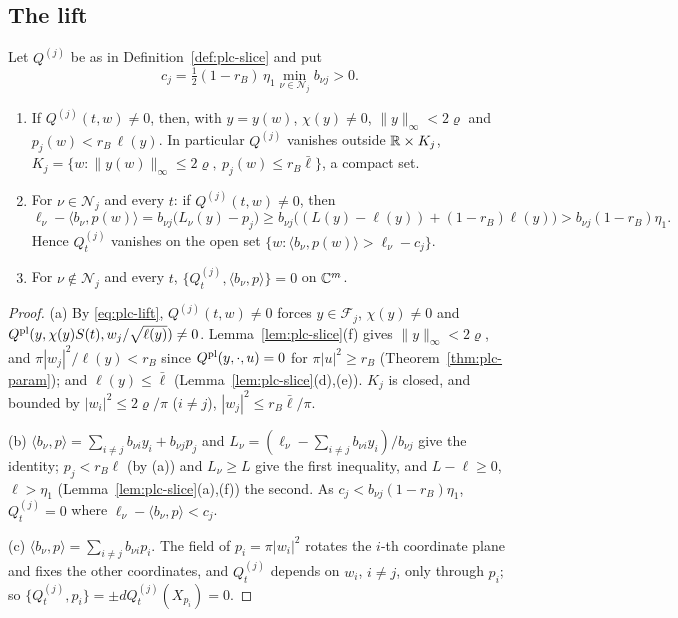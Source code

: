 \subsection{The lift}\label{sec:plc-lift}

\begin{lemma}\label{lem:plc-faces}
Let $Q^{(j)}$ be as in Definition~\ref{def:plc-slice} and put
\[
 c_j=\tfrac12(1-r_B)\,\eta_1\min_{\nu\in\mathcal N_j}b_{\nu j}>0.
\]
\begin{enumerate}[label=(\alph*)]
\item If $Q^{(j)}(t,w)\ne0$, then, with $y=y(w)$, $\chi(y)\ne0$, $\|y\|_\infty<2\varrho$ and $p_j(w)<r_B\,\ell(y)$. In particular
 $Q^{(j)}$ vanishes outside $\mathbb{R}\times K_j$, $K_j=\{w:\|y(w)\|_\infty\le2\varrho,\ p_j(w)\le r_B\bar\ell\}$, a compact set.
\item For $\nu\in\mathcal N_j$ and every $t$: if $Q^{(j)}(t,w)\ne0$, then
 \begin{equation}\label{eq:plc-collar}
  \ell_\nu-\langle b_\nu,p(w)\rangle=b_{\nu j}\bigl(L_\nu(y)-p_j\bigr)\ge b_{\nu j}\bigl((L(y)-\ell(y))+(1-r_B)\ell(y)\bigr)
  >b_{\nu j}(1-r_B)\eta_1 .
 \end{equation}
 Hence $Q^{(j)}_t$ vanishes on the open set $\{w:\langle b_\nu,p(w)\rangle>\ell_\nu-c_j\}$.
\item For $\nu\notin\mathcal N_j$ and every $t$, $\{Q^{(j)}_t,\langle b_\nu,p\rangle\}=0$ on $\mathbb{C}^m$.
\end{enumerate}
\end{lemma}

\begin{proof}
(a) By \eqref{eq:plc-lift}, $Q^{(j)}(t,w)\ne0$ forces $y\in\mathcal F_j$, $\chi(y)\ne0$ and
$Q^{\rm pl}(y,\chi(y)S(t),w_j/\sqrt{\ell(y)})\ne0$. Lemma~\ref{lem:plc-slice}(f) gives $\|y\|_\infty<2\varrho$, and
$\pi|w_j|^2/\ell(y)<r_B$ since $Q^{\rm pl}(y,\cdot,u)=0$ for $\pi|u|^2\ge r_B$ (Theorem~\ref{thm:plc-param}); and $\ell(y)\le\bar\ell$
(Lemma~\ref{lem:plc-slice}(d),(e)). $K_j$ is closed, and bounded by $|w_i|^2\le2\varrho/\pi$ ($i\ne j$), $|w_j|^2\le r_B\bar\ell/\pi$.

(b) $\langle b_\nu,p\rangle=\sum_{i\ne j}b_{\nu i}y_i+b_{\nu j}p_j$ and $L_\nu=(\ell_\nu-\sum_{i\ne j}b_{\nu i}y_i)/b_{\nu j}$ give the identity;
$p_j<r_B\ell$ (by (a)) and $L_\nu\ge L$ give the first inequality, and $L-\ell\ge0$, $\ell>\eta_1$
(Lemma~\ref{lem:plc-slice}(a),(f)) the second. As $c_j<b_{\nu j}(1-r_B)\eta_1$, $Q^{(j)}_t=0$ where $\ell_\nu-\langle b_\nu,p\rangle<c_j$.

(c) $\langle b_\nu,p\rangle=\sum_{i\ne j}b_{\nu i}p_i$. The field of $p_i=\pi|w_i|^2$ rotates the $i$-th coordinate plane and fixes the
other coordinates, and $Q^{(j)}_t$ depends on $w_i$, $i\ne j$, only through $p_i$; so $\{Q^{(j)}_t,p_i\}=\pm dQ^{(j)}_t(X_{p_i})=0$.
\end{proof}

